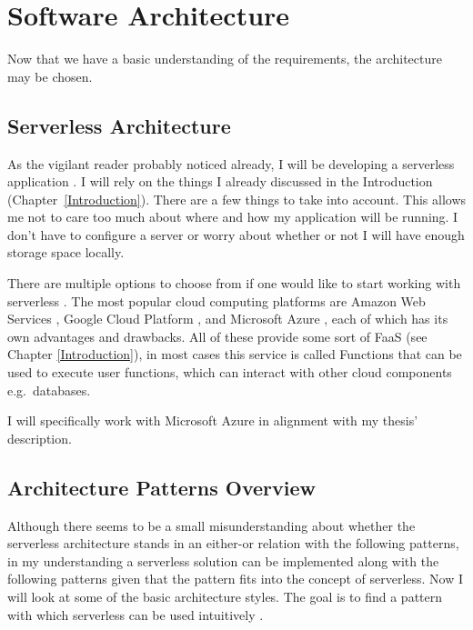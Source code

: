 \chapter{Software Architecture}\label{Ch2}
Now that we have a basic understanding of the requirements, the architecture may be chosen. 

\section{Serverless Architecture}

As the vigilant reader probably noticed already, I will be developing a serverless application \cite{AzurePatterns}. I will rely on the things I already discussed in the Introduction  (Chapter~\ref{Introduction}). There are a few things to take into account.  This allows me not to care too much about where and how my application will be running. I don't have to configure a server or worry about whether or not I will have enough storage space locally.

There are multiple options to choose from if one would like to start working with serverless \cite{ServerlessPlatforms}. The most popular cloud computing platforms are Amazon Web Services \cite{AWS}, Google Cloud Platform \cite{GCP}, and Microsoft Azure \cite{MA}, each of which has its own advantages and drawbacks. All of these provide some sort of FaaS (see Chapter \ref{Introduction}), in most cases this service is called Functions that can be used to execute user functions, which can interact with other cloud components e.g.\ databases.

I will specifically work with Microsoft Azure in alignment with my thesis' description.

\section{Architecture Patterns Overview}
 Although there seems to be a small misunderstanding about whether the serverless architecture stands in an either-or relation with the following patterns, in my understanding a serverless solution can be implemented along with the following patterns given that the pattern fits into the concept of serverless. Now I will look at some of the basic architecture styles. The goal is to find a pattern with which serverless can be used intuitively \cite{AzurePatterns}\cite{SoftArch}\cite{MarkRichards}.


